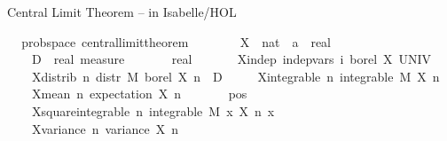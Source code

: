 \documentclass[usepdftitle=false]{beamer}
\begin{document}
\begin{frame}{Central Limit Theorem -- in Isabelle/HOL} %

\begin{isabellebody}
\isamarkupfalse%
\ {\isacharparenleft}\,\ prob{\isacharunderscore}space{\isacharparenright}\ central{\isacharunderscore}limit{\isacharunderscore}theorem{\isacharcolon}\isanewline
\ \ \ \isanewline
\ \ \ \ X\ {\isacharcolon}{\isacharcolon}\ {\isachardoublequoteopen}nat\ {\isasymRightarrow}\ {\isacharprime}a\ {\isasymRightarrow}\ real{\isachardoublequoteclose}\ \isanewline
\ \ \ \ D\ {\isacharcolon}{\isacharcolon}\ {\isachardoublequoteopen}real\ measure{\isachardoublequoteclose}\ \isanewline
\ \ \ \ {\isasymsigma}\ {\isacharcolon}{\isacharcolon}\ real\isanewline
\ \ \isanewline
\ \ \ \ X{\isacharunderscore}indep{\isacharcolon}\ {\isachardoublequoteopen}indep{\isacharunderscore}vars\ {\isacharparenleft}{\isasymlambda}i{\isachardot}\ borel{\isacharparenright}\ X\ UNIV{\isachardoublequoteclose}\ \isanewline
\ \ \ \ X{\isacharunderscore}distrib{\isacharcolon}\ {\isachardoublequoteopen}{\isasymAnd}n{\isachardot}\ distr\ M\ borel\ {\isacharparenleft}X\ n{\isacharparenright}\ {\isacharequal}\ D{\isachardoublequoteclose}\ \isanewline
\ \ \ \ X{\isacharunderscore}integrable{\isacharcolon}\ {\isachardoublequoteopen}{\isasymAnd}n{\isachardot}\ integrable\ M\ {\isacharparenleft}X\ n{\isacharparenright}{\isachardoublequoteclose}\ \isanewline
\ \ \ \ X{\isacharunderscore}mean{\isacharunderscore}{}{\isacharcolon}\ {\isachardoublequoteopen}{\isasymAnd}n{\isachardot}\ expectation\ {\isacharparenleft}X\ n{\isacharparenright}\ {\isacharequal}\ {}{\isachardoublequoteclose}\ \isanewline
\ \ \ \ {\isasymsigma}{\isacharunderscore}pos{\isacharcolon}\ {\isachardoublequoteopen}{\isasymsigma}\ {\isachargreater}\ {}{\isachardoublequoteclose}\ \isanewline
\ \ \ \ X{\isacharunderscore}square{\isacharunderscore}integrable{\isacharcolon}\ {\isachardoublequoteopen}{\isasymAnd}n{\isachardot}\ integrable\ M\ {\isacharparenleft}{\isasymlambda}x{\isachardot}\ {\isacharparenleft}X\ n\ x{\isacharparenright}\ \isanewline
\ \ \ \ X{\isacharunderscore}variance{\isacharcolon}\ {\isachardoublequoteopen}{\isasymAnd}n{\isachardot}\ variance\ {\isacharparenleft}X\ n{\isacharparenright}\ {\isacharequal}\ {\isasymsigma}\isanewline

\end{isabellebody}
\end{frame}
\end{document}
